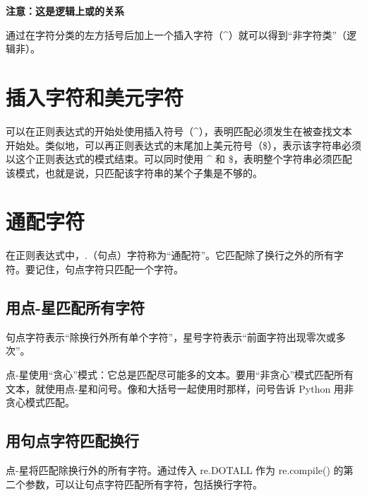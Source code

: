 \textbf{注意：这是逻辑上或的关系}

通过在字符分类的左方括号后加上一个插入字符（\^{}）就可以得到“非字符类”（逻辑非）。

\section{插入字符和美元字符}
可以在正则表达式的开始处使用插入符号（\^{}），表明匹配必须发生在被查找文本开始处。类似地，可以再正则表达式的末尾加上美元符号（\$），表示该字符串必须以这个正则表达式的模式结束。可以同时使用 \^{} 和 \$，表明整个字符串必须匹配该模式，也就是说，只匹配该字符串的某个子集是不够的。
\section{通配字符}
在正则表达式中，.（句点）字符称为“通配符”。它匹配除了换行之外的所有字符。要记住，句点字符只匹配一个字符。
\subsection{用点-星匹配所有字符}
句点字符表示“除换行外所有单个字符”，星号字符表示“前面字符出现零次或多次”。

点-星使用“贪心”模式：它总是匹配尽可能多的文本。要用“非贪心”模式匹配所有文本，就使用点-星和问号。像和大括号一起使用时那样，问号告诉 Python 用非贪心模式匹配。
\subsection{用句点字符匹配换行}
点-星将匹配除换行外的所有字符。通过传入 re.DOTALL 作为 re.compile() 的第二个参数，可以让句点字符匹配所有字符，包括换行字符。

